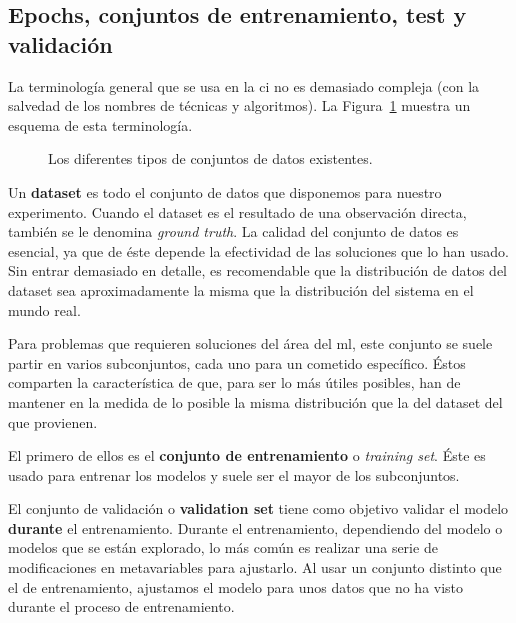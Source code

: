 \subsection{Epochs, conjuntos de entrenamiento, test y validación}

La terminología general que se usa en la \gls{ci} no es demasiado compleja (con la salvedad de los nombres de técnicas y algoritmos). La Figura~\ref{fig:different-kinds-of-datasets} muestra un esquema de esta terminología.

\begin{figure}
	\caption[Separación clásica de conjuntos de datos en problemas de ]{Los diferentes tipos de conjuntos de datos existentes.}
	\label{fig:different-kinds-of-datasets}
\end{figure}

Un \textbf{dataset} es todo el conjunto de datos que disponemos para nuestro experimento. Cuando el dataset es el resultado de una observación directa, también se le denomina \textit{ground truth}. La calidad del conjunto de datos es esencial, ya que de éste depende la efectividad de las soluciones que lo han usado. Sin entrar demasiado en detalle, es recomendable que la distribución de datos del dataset sea aproximadamente la misma que la distribución del sistema en el mundo real.

Para problemas que requieren soluciones del área del \ac{ml}, este conjunto se suele partir en varios subconjuntos, cada uno para un cometido específico. Éstos comparten la característica de que, para ser lo más útiles posibles, han de mantener en la medida de lo posible la misma distribución que la del dataset del que provienen.

El primero de ellos es el \textbf{conjunto de entrenamiento} o \textit{training set}. Éste es usado para entrenar los modelos y suele ser el mayor de los subconjuntos.

El conjunto de validación o \textbf{validation set} tiene como objetivo validar el modelo \textbf{durante} el entrenamiento. Durante el entrenamiento, dependiendo del modelo o modelos que se están explorado, lo más común es realizar una serie de modificaciones en metavariables para ajustarlo. Al usar un conjunto distinto que el de entrenamiento, ajustamos el modelo para unos datos que no ha visto durante el proceso de entrenamiento.

